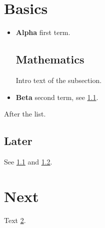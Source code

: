 \documentclass{article}
\begin{document}
\tableofcontents
\section{Basics}\label{s1}
\begin{itemize}
\item \textbf{Alpha} first term.
\subsection{Mathematics}\label{mg}
Intro text of the subsection.
\item \textbf{Beta} second term, see \ref{mg}.
\end{itemize}
After the list.
\subsection{Later}\label{lt}
See \ref{mg} and \ref{lt}.
\section{Next}\label{s2}
Text \ref{s2}.
\end{document}
